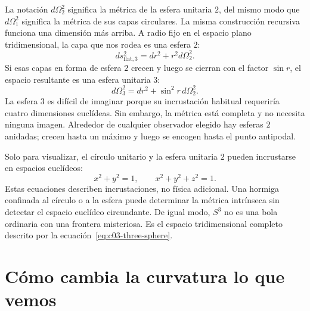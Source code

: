 La notación \(d\Omega_2^2\) significa la métrica de la esfera unitaria \(2\), del mismo modo que \(d\Omega_1^2\) significa la métrica de sus capas circulares. La misma construcción recursiva funciona una dimensión más arriba. A radio fijo en el espacio plano tridimensional, la capa que nos rodea es una esfera \(2\):
\begin{equation}
ds_{\text{flat},3}^2 = dr^2 + r^2 d\Omega_2^2.
\label{eq:c03-flat-three-polar}
\end{equation}
Si esas capas en forma de esfera \(2\) crecen y luego se cierran con el factor \(\sin r\), el espacio resultante es una esfera unitaria \(3\):
\begin{equation}
d\Omega_3^2 = dr^2 + \sin^2 r\, d\Omega_2^2.
\label{eq:c03-three-sphere}
\end{equation}
La esfera \(3\) es difícil de imaginar porque su incrustación habitual requeriría cuatro dimensiones euclídeas. Sin embargo, la métrica está completa y no necesita ninguna imagen. Alrededor de cualquier observador elegido hay esferas \(2\) anidadas; crecen hasta un máximo y luego se encogen hasta el punto antipodal.

\begin{classroomqa}\end{classroomqa}

Solo para visualizar, el círculo unitario y la esfera unitaria \(2\) pueden incrustarse en espacios euclídeos:
\begin{equation}
x^2+y^2=1,
\qquad
x^2+y^2+z^2=1.
\end{equation}
Estas ecuaciones describen incrustaciones, no física adicional. Una hormiga confinada al círculo o a la esfera puede determinar la métrica intrínseca sin detectar el espacio euclídeo circundante. De igual modo, \(S^3\) no es una bola ordinaria con una frontera misteriosa. Es el espacio tridimensional completo descrito por la ecuación~\eqref{eq:c03-three-sphere}.

\section{Cómo cambia la curvatura lo que vemos}

